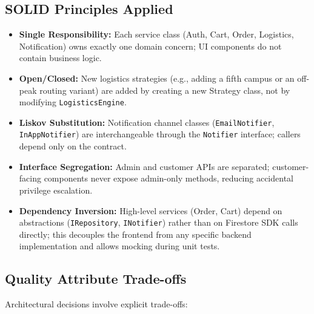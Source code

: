 \documentclass[11pt,a4paper]{article}
\begin{document}
\subsection{SOLID Principles Applied}
\begin{itemize}
    \item \textbf{Single Responsibility:} Each service class (Auth, Cart, Order, Logistics, Notification) owns exactly one domain concern; UI components do not contain business logic.
    \item \textbf{Open/Closed:} New logistics strategies (e.g., adding a fifth campus or an off-peak routing variant) are added by creating a new Strategy class, not by modifying \texttt{LogisticsEngine}.
    \item \textbf{Liskov Substitution:} Notification channel classes (\texttt{EmailNotifier}, \texttt{InAppNotifier}) are interchangeable through the \texttt{Notifier} interface; callers depend only on the contract.
    \item \textbf{Interface Segregation:} Admin and customer APIs are separated; customer-facing components never expose admin-only methods, reducing accidental privilege escalation.
    \item \textbf{Dependency Inversion:} High-level services (Order, Cart) depend on abstractions (\texttt{IRepository}, \texttt{INotifier}) rather than on Firestore SDK calls directly; this decouples the frontend from any specific backend implementation and allows mocking during unit tests.
\end{itemize}

\subsection{Quality Attribute Trade-offs}
Architectural decisions involve explicit trade-offs:
\end{document}
